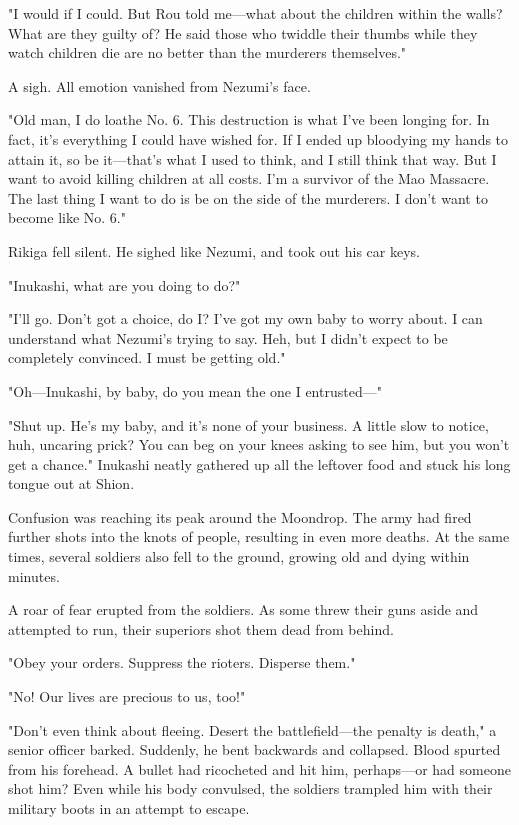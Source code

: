 "I would if I could. But Rou told me---what about the children within the
walls? What are they guilty of? He said those who twiddle their thumbs
while they watch children die are no better than the murderers
themselves."

A sigh. All emotion vanished from Nezumi's face.

"Old man, I do loathe No. 6. This destruction is what I've been longing
for. In fact, it's everything I could have wished for. If I ended up
bloodying my hands to attain it, so be it---that's what I used to think,
and I still think that way. But I want to avoid killing children at all
costs. I'm a survivor of the Mao Massacre. The last thing I want to do
is be on the side of the murderers. I don't want to become like No. 6."

Rikiga fell silent. He sighed like Nezumi, and took out his car keys.

"Inukashi, what are you doing to do?"

"I'll go. Don't got a choice, do I? I've got my own baby to worry about.
I can understand what Nezumi's trying to say. Heh, but I didn't expect
to be completely convinced. I must be getting old."

"Oh---Inukashi, by baby, do you mean the one I entrusted---"

"Shut up. He's my baby, and it's none of your business. A little slow to
notice, huh, uncaring prick? You can beg on your knees asking to see
him, but you won't get a chance." Inukashi neatly gathered up all the
leftover food and stuck his long tongue out at Shion.

\myspace

Confusion was reaching its peak around the Moondrop. The army had fired
further shots into the knots of people, resulting in even more deaths.
At the same times, several soldiers also fell to the ground, growing old
and dying within minutes.

A roar of fear erupted from the soldiers. As some threw their guns aside
and attempted to run, their superiors shot them dead from behind.

"Obey your orders. Suppress the rioters. Disperse them."

"No! Our lives are precious to us, too!"

"Don't even think about fleeing. Desert the battlefield---the penalty is
death," a senior officer barked. Suddenly, he bent backwards and
collapsed. Blood spurted from his forehead. A bullet had ricocheted and
hit him, perhaps---or had someone shot him? Even while his body convulsed,
the soldiers trampled him with their military boots in an attempt to
escape.

